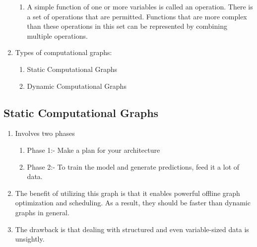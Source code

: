 \begin{enumerate}
\begin{enumerate}
        \item A simple function of one or more variables is called an operation.
        There is a set of operations that are permitted.
        Functions that are more complex than these operations in this set can be represented by combining multiple operations.
        \hfill \cite{geeksforgeeks/deep-learning/computational-graphs-in-deep-learning}
    \end{enumerate}

    \item Types of computational graphs:
    \begin{enumerate}
        \item Static Computational Graphs
        \hfill \cite{geeksforgeeks/deep-learning/computational-graphs-in-deep-learning}

        \item Dynamic Computational Graphs
        \hfill \cite{geeksforgeeks/deep-learning/computational-graphs-in-deep-learning}
    \end{enumerate}
\end{enumerate}


\subsection{Static Computational Graphs}
\begin{enumerate}
    \item Involves two phases
    \begin{enumerate}
        \item Phase 1:- Make a plan for your architecture
        \hfill \cite{geeksforgeeks/deep-learning/computational-graphs-in-deep-learning}

        \item Phase 2:- To train the model and generate predictions, feed it a lot of data.
        \hfill \cite{geeksforgeeks/deep-learning/computational-graphs-in-deep-learning}
    \end{enumerate}

    \item The benefit of utilizing this graph is that it enables powerful offline graph optimization and scheduling. As a result, they should be faster than dynamic graphs in general.
    \hfill \cite{geeksforgeeks/deep-learning/computational-graphs-in-deep-learning}

    \item The drawback is that dealing with structured and even variable-sized data is unsightly.
    \hfill \cite{geeksforgeeks/deep-learning/computational-graphs-in-deep-learning}
\end{enumerate}



